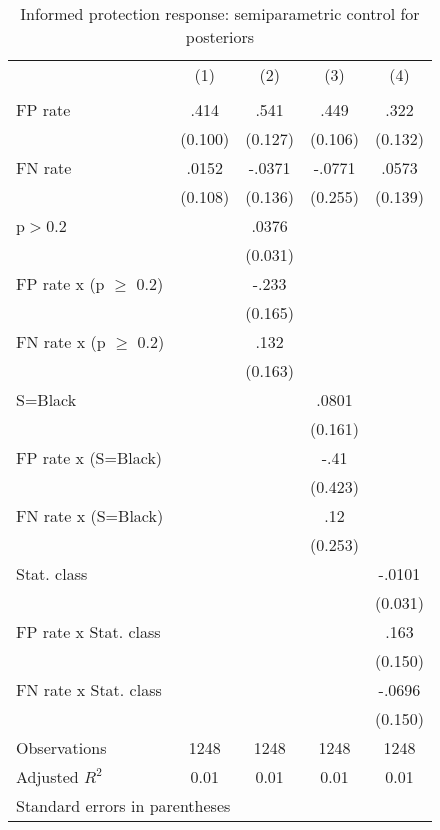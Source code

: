 \begin{table}[htbp]\centering
\caption{Informed protection response: semiparametric control for posteriors}
\begin{tabular}{l*{4}{c}}
\hline\hline
                &\multicolumn{1}{c}{(1)}&\multicolumn{1}{c}{(2)}&\multicolumn{1}{c}{(3)}&\multicolumn{1}{c}{(4)}\\
                &\multicolumn{1}{c}{}&\multicolumn{1}{c}{}&\multicolumn{1}{c}{}&\multicolumn{1}{c}{}\\
\hline
FP rate         &     .414&     .541&     .449&     .322\\
                &  (0.100)&  (0.127)&  (0.106)&  (0.132)\\
FN rate         &    .0152&   -.0371&   -.0771&    .0573\\
                &  (0.108)&  (0.136)&  (0.255)&  (0.139)\\
p$>$0.2         &         &    .0376&         &         \\
                &         &  (0.031)&         &         \\
FP rate x (p $\geq$ 0.2)&         &    -.233&         &         \\
                &         &  (0.165)&         &         \\
FN rate x (p $\geq$ 0.2)&         &     .132&         &         \\
                &         &  (0.163)&         &         \\
S=Black         &         &         &    .0801&         \\
                &         &         &  (0.161)&         \\
FP rate x (S=Black)&         &         &     -.41&         \\
                &         &         &  (0.423)&         \\
FN rate x (S=Black)&         &         &      .12&         \\
                &         &         &  (0.253)&         \\
Stat. class     &         &         &         &   -.0101\\
                &         &         &         &  (0.031)\\
FP rate x Stat. class&         &         &         &     .163\\
                &         &         &         &  (0.150)\\
FN rate x Stat. class&         &         &         &   -.0696\\
                &         &         &         &  (0.150)\\
\hline
Observations    &     1248&     1248&     1248&     1248\\
Adjusted \(R^{2}\)&     0.01&     0.01&     0.01&     0.01\\
\hline\hline
\multicolumn{5}{l}{\footnotesize Standard errors in parentheses}\\
\end{tabular}
\end{table}
